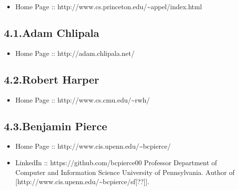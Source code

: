 \documentclass[12pt,twoside]{article}
\begin{document}
\begin{itemize}[noitemsep,topsep=\mdcompacttopsep]%

\item{}Home Page :: http://www.cs.princeton.edu/\textasciitilde{}appel/index.html%
\end{itemize}%

\subsection{4.1.\hspace*{0.5em}Adam Chlipala}\label{sec-adam-chlipala}%

\begin{itemize}[noitemsep,topsep=\mdcompacttopsep]%

\item{}Home Page :: http://adam.chlipala.net/%
\end{itemize}%

\subsection{4.2.\hspace*{0.5em}Robert Harper}\label{sec-robert-harper}%

\begin{itemize}[noitemsep,topsep=\mdcompacttopsep]%

\item{}Home Page :: http://www.cs.cmu.edu/\textasciitilde{}rwh/%
\end{itemize}%

\subsection{4.3.\hspace*{0.5em}Benjamin Pierce}\label{sec-benjamin-pierce}%

\begin{itemize}[noitemsep,topsep=\mdcompacttopsep]%

\item{}Home Page :: http://www.cis.upenn.edu/\textasciitilde{}bcpierce/%

\item{}LinkedIn :: https://github.com/bcpierce00
Professor Department of Computer and Information Science University of Pennsylvania.
Author of [http://www.cis.upenn.edu/\textasciitilde{}bcpierce/sf[??]].%
\end{itemize}%
\end{document}
